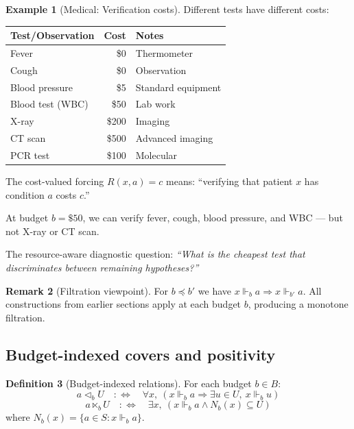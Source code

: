 \documentclass[11pt]{article}
\theoremstyle{definition}
\newtheorem{definition}{Definition}[section]
\newtheorem{remark}[definition]{Remark}
\newtheorem{example}[definition]{Example}
\theoremstyle{plain}
\newcommand{\forces}{\Vdash}
\newcommand{\ltimesrel}{\ltimes}
\newcommand{\covers}{\triangleleft}
\begin{document}
\begin{example}[Medical: Verification costs]\label{ex:medical-costs}
Different tests have different costs:

\begin{center}
\begin{tabular}{lrl}
\toprule
\textbf{Test/Observation} & \textbf{Cost} & \textbf{Notes} \\
\midrule
Fever & \$0 & Thermometer \\
Cough & \$0 & Observation \\
Blood pressure & \$5 & Standard equipment \\
Blood test (WBC) & \$50 & Lab work \\
X-ray & \$200 & Imaging \\
CT scan & \$500 & Advanced imaging \\
PCR test & \$100 & Molecular \\
\bottomrule
\end{tabular}
\end{center}

The cost-valued forcing $R(x, a) = c$ means: ``verifying that patient $x$ has condition $a$ costs $c$.''

At budget $b = \$50$, we can verify fever, cough, blood pressure, and WBC --- but not X-ray or CT scan.

The resource-aware diagnostic question: \emph{``What is the cheapest test that discriminates between remaining hypotheses?''}
\end{example}

\begin{remark}[Filtration viewpoint]
For $b\preceq b'$ we have $x\forces_b a \Rightarrow x\forces_{b'} a$.
All constructions from earlier sections apply at each budget $b$, producing a monotone filtration.
\end{remark}

\subsection{Budget-indexed covers and positivity}

\begin{definition}[Budget-indexed relations]
For each budget $b \in B$:
\[
a \covers_b U \quad:\Longleftrightarrow\quad \forall x,\ (x \forces_b a \Rightarrow \exists u \in U,\ x \forces_b u)
\]
\[
a \ltimesrel_b U \quad:\Longleftrightarrow\quad \exists x,\ (x \forces_b a \land N_b(x) \subseteq U)
\]
where $N_b(x) = \{a \in S : x \forces_b a\}$.
\end{definition}
\end{document}
